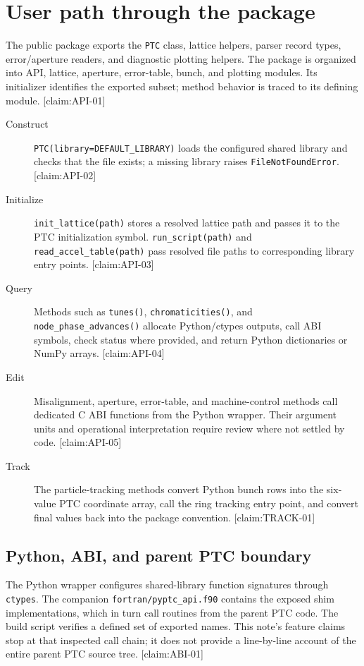 \section{User path through the package}
\label{sec:user-path}

The public package exports the \texttt{PTC} class, lattice helpers, parser record types, error/aperture readers, and diagnostic plotting helpers. The package is organized into API, lattice, aperture, error-table, bunch, and plotting modules. Its initializer identifies the exported subset; method behavior is traced to its defining module. [claim:API-01]

\begin{description}
  \item[Construct] \texttt{PTC(library=DEFAULT\_LIBRARY)} loads the configured shared library and checks that the file exists; a missing library raises \texttt{FileNotFoundError}. [claim:API-02]
  \item[Initialize] \texttt{init\_lattice(path)} stores a resolved lattice path and passes it to the PTC initialization symbol. \texttt{run\_script(path)} and \texttt{read\_accel\_table(path)} pass resolved file paths to corresponding library entry points. [claim:API-03]
  \item[Query] Methods such as \texttt{tunes()}, \texttt{chromaticities()}, and \texttt{node\_phase\_advances()} allocate Python/ctypes outputs, call ABI symbols, check status where provided, and return Python dictionaries or NumPy arrays. [claim:API-04]
  \item[Edit] Misalignment, aperture, error-table, and machine-control methods call dedicated C ABI functions from the Python wrapper. Their argument units and operational interpretation require review where not settled by code. [claim:API-05]
  \item[Track] The particle-tracking methods convert Python bunch rows into the six-value PTC coordinate array, call the ring tracking entry point, and convert final values back into the package convention. [claim:TRACK-01]
\end{description}

\subsection{Python, ABI, and parent PTC boundary}

The Python wrapper configures shared-library function signatures through \texttt{ctypes}. The companion \texttt{fortran/pyptc\_api.f90} contains the exposed shim implementations, which in turn call routines from the parent PTC code. The build script verifies a defined set of exported names. This note's feature claims stop at that inspected call chain; it does not provide a line-by-line account of the entire parent PTC source tree. [claim:ABI-01]

